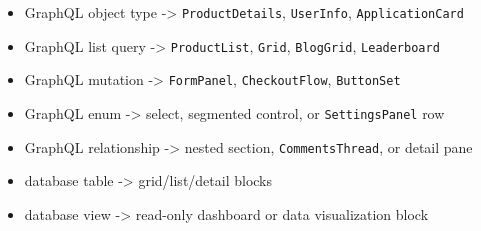 \begin{itemize}
\tightlist
\item
  GraphQL object type -\textgreater{} \texttt{P\allowbreak{}r\allowbreak{}o\allowbreak{}d\allowbreak{}u\allowbreak{}c\allowbreak{}t\allowbreak{}D\allowbreak{}e\allowbreak{}t\allowbreak{}a\allowbreak{}i\allowbreak{}l\allowbreak{}s}, \texttt{U\allowbreak{}s\allowbreak{}e\allowbreak{}r\allowbreak{}I\allowbreak{}n\allowbreak{}f\allowbreak{}o}, \texttt{A\allowbreak{}p\allowbreak{}p\allowbreak{}l\allowbreak{}i\allowbreak{}c\allowbreak{}a\allowbreak{}t\allowbreak{}i\allowbreak{}o\allowbreak{}n\allowbreak{}C\allowbreak{}a\allowbreak{}r\allowbreak{}d}
\item
  GraphQL list query -\textgreater{} \texttt{P\allowbreak{}r\allowbreak{}o\allowbreak{}d\allowbreak{}u\allowbreak{}c\allowbreak{}t\allowbreak{}L\allowbreak{}i\allowbreak{}s\allowbreak{}t}, \texttt{G\allowbreak{}r\allowbreak{}i\allowbreak{}d}, \texttt{B\allowbreak{}l\allowbreak{}o\allowbreak{}g\allowbreak{}G\allowbreak{}r\allowbreak{}i\allowbreak{}d}, \texttt{L\allowbreak{}e\allowbreak{}a\allowbreak{}d\allowbreak{}e\allowbreak{}r\allowbreak{}b\allowbreak{}o\allowbreak{}a\allowbreak{}r\allowbreak{}d}
\item
  GraphQL mutation -\textgreater{} \texttt{F\allowbreak{}o\allowbreak{}r\allowbreak{}m\allowbreak{}P\allowbreak{}a\allowbreak{}n\allowbreak{}e\allowbreak{}l}, \texttt{C\allowbreak{}h\allowbreak{}e\allowbreak{}c\allowbreak{}k\allowbreak{}o\allowbreak{}u\allowbreak{}t\allowbreak{}F\allowbreak{}l\allowbreak{}o\allowbreak{}w}, \texttt{B\allowbreak{}u\allowbreak{}t\allowbreak{}t\allowbreak{}o\allowbreak{}n\allowbreak{}S\allowbreak{}e\allowbreak{}t}
\item
  GraphQL enum -\textgreater{} select, segmented control, or \texttt{S\allowbreak{}e\allowbreak{}t\allowbreak{}t\allowbreak{}i\allowbreak{}n\allowbreak{}g\allowbreak{}s\allowbreak{}P\allowbreak{}a\allowbreak{}n\allowbreak{}e\allowbreak{}l} row
\item
  GraphQL relationship -\textgreater{} nested section, \texttt{C\allowbreak{}o\allowbreak{}m\allowbreak{}m\allowbreak{}e\allowbreak{}n\allowbreak{}t\allowbreak{}s\allowbreak{}T\allowbreak{}h\allowbreak{}r\allowbreak{}e\allowbreak{}a\allowbreak{}d}, or detail pane
\item
  database table -\textgreater{} grid/list/detail blocks
\item
  database view -\textgreater{} read-only dashboard or data visualization block
\end{itemize}

